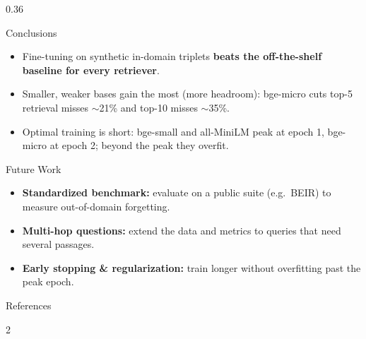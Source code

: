 \documentclass[final]{beamer}
\newcommand{\ConclFont}{\fontsize{24}{31}\selectfont}    %
\begin{document}
\begin{frame}[t]
\begin{columns}[t,onlytextwidth]
\begin{column}{0.36\linewidth}
  \vspace{4mm}

  \begin{pblock}{Conclusions}
    \ConclFont
    \begin{itemize}
      \item Fine-tuning on synthetic in-domain triplets \textbf{beats the off-the-shelf
            baseline for every retriever}.
      \item Smaller, weaker bases gain the most (more headroom): bge-micro cuts top-5
            retrieval misses $\sim$21\% and top-10 misses $\sim$35\%.
      \item Optimal training is short: bge-small and all-MiniLM peak at epoch 1, bge-micro at
            epoch 2; beyond the peak they overfit.
    \end{itemize}
  \end{pblock}

  \vspace{4mm}

  \begin{pblock}{Future Work}
    \ConclFont
    \begin{itemize}
      \item \textbf{Standardized benchmark:} evaluate on a public suite (e.g.\ BEIR) to
            measure out-of-domain forgetting.
      \item \textbf{Multi-hop questions:} extend the data and metrics to queries that need
            several passages.
      \item \textbf{Early stopping \& regularization:} train longer without overfitting past
            the peak epoch.
    \end{itemize}
  \end{pblock}

  \vspace{4mm}

  \begin{pblock}{References}
    {\fontsize{14}{17}\selectfont
     \nocite{*}
     \setlength{\columnsep}{7mm}
     \begin{multicols}{2}\raggedright
       
     \end{multicols}}
  \end{pblock}
\end{column}
\end{columns}

\end{frame}
\end{document}
